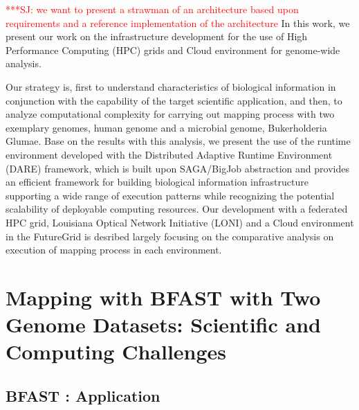 \documentclass[12pt]{article}
\newcommand{\jhanote}[1]{ {\textcolor{red}     {***SJ: #1}}}
\newcommand{\jhanote}[1]{}
\begin{document}
\jhanote{we want to present a strawman of an architecture based upon
  requirements and a reference implementation of the architecture} In
this work, we present our work on the infrastructure development for
the use of High Performance Computing (HPC) grids and Cloud
environment for genome-wide analysis.

Our strategy is, first to understand characteristics of biological information in conjunction with the capability of the target scientific application, and then, to analyze computational complexity for carrying out mapping process with two exemplary genomes, human genome and a microbial genome, Bukerholderia Glumae.  Base on the results with this analysis, we present the use of the runtime environment developed with the Distributed Adaptive Runtime Environment (DARE) framework, which is built upon SAGA/BigJob abstraction and provides an efficient framework for building biological information infrastructure supporting a wide range of execution patterns while recognizing the potential scalability of deployable computing resources.  Our development with a federated HPC grid, Louisiana Optical Network Initiative (LONI) and a Cloud environment in the FutureGrid is desribed largely focusing on the comparative analysis on execution of mapping process in each environment. 




\section{Mapping with BFAST with Two Genome Datasets: Scientific and Computing Challenges}

\subsection{BFAST : Application}
\end{document}

